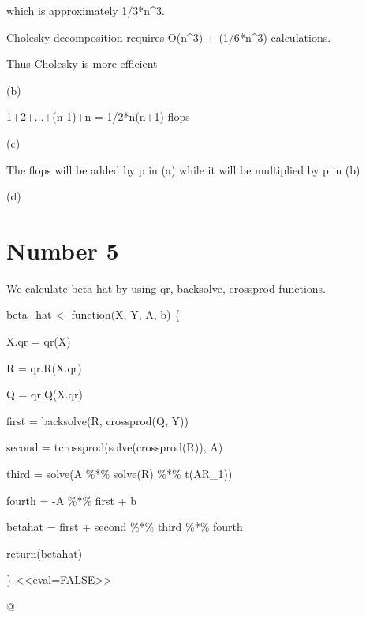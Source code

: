 \documentclass[english]{article}\usepackage[]{graphicx}\usepackage[]{color}
\begin{document}
which is approximately 1/3{*}n\textasciicircum{}3.



Cholesky decomposition requires O(n\textasciicircum{}3) + (1/6{*}n\textasciicircum{}3)
calculations.

Thus Cholesky is more efficient



(b)

1+2+...+(n-1)+n = 1/2{*}n(n+1) flops



(c)

The flops will be added by p in (a) while it will be multiplied by
p in (b)



(d)


\section*{Number 5}

We calculate beta hat by using qr, backsolve, crossprod functions.

beta\_hat <- function(X, Y, A, b) \{

  X.qr = qr(X)

  R = qr.R(X.qr)

  Q = qr.Q(X.qr)

  first = backsolve(R, crossprod(Q, Y))

  second = tcrossprod(solve(crossprod(R)), A)

third = solve(A \%{*}\% solve(R) \%{*}\% t(AR\_1))

  fourth = -A \%{*}\% first + b

  betahat = first + second \%{*}\% third \%{*}\% fourth

  return(betahat)

\} <<eval=FALSE>>




@
\end{document}

